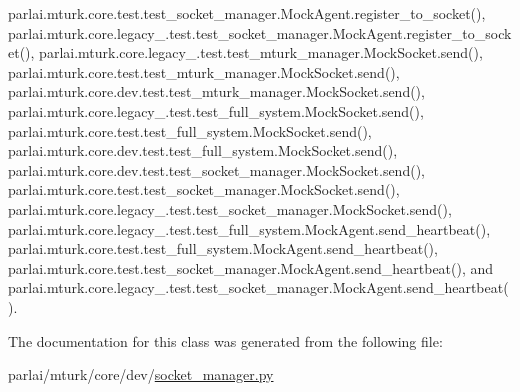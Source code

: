 parlai.\+mturk.\+core.\+test.\+test\+\_\+socket\+\_\+manager.\+Mock\+Agent.\+register\+\_\+to\+\_\+socket(), parlai.\+mturk.\+core.\+legacy\+\_.\+test.\+test\+\_\+socket\+\_\+manager.\+Mock\+Agent.\+register\+\_\+to\+\_\+socket(), parlai.\+mturk.\+core.\+legacy\+\_.\+test.\+test\+\_\+mturk\+\_\+manager.\+Mock\+Socket.\+send(), parlai.\+mturk.\+core.\+test.\+test\+\_\+mturk\+\_\+manager.\+Mock\+Socket.\+send(), parlai.\+mturk.\+core.\+dev.\+test.\+test\+\_\+mturk\+\_\+manager.\+Mock\+Socket.\+send(), parlai.\+mturk.\+core.\+legacy\+\_.\+test.\+test\+\_\+full\+\_\+system.\+Mock\+Socket.\+send(), parlai.\+mturk.\+core.\+test.\+test\+\_\+full\+\_\+system.\+Mock\+Socket.\+send(), parlai.\+mturk.\+core.\+dev.\+test.\+test\+\_\+full\+\_\+system.\+Mock\+Socket.\+send(), parlai.\+mturk.\+core.\+dev.\+test.\+test\+\_\+socket\+\_\+manager.\+Mock\+Socket.\+send(), parlai.\+mturk.\+core.\+test.\+test\+\_\+socket\+\_\+manager.\+Mock\+Socket.\+send(), parlai.\+mturk.\+core.\+legacy\+\_.\+test.\+test\+\_\+socket\+\_\+manager.\+Mock\+Socket.\+send(), parlai.\+mturk.\+core.\+legacy\+\_.\+test.\+test\+\_\+full\+\_\+system.\+Mock\+Agent.\+send\+\_\+heartbeat(), parlai.\+mturk.\+core.\+test.\+test\+\_\+full\+\_\+system.\+Mock\+Agent.\+send\+\_\+heartbeat(), parlai.\+mturk.\+core.\+test.\+test\+\_\+socket\+\_\+manager.\+Mock\+Agent.\+send\+\_\+heartbeat(), and parlai.\+mturk.\+core.\+legacy\+\_.\+test.\+test\+\_\+socket\+\_\+manager.\+Mock\+Agent.\+send\+\_\+heartbeat().



The documentation for this class was generated from the following file\+:\begin{DoxyCompactItemize}
\item 
parlai/mturk/core/dev/\hyperlink{dev_2socket__manager_8py}{socket\+\_\+manager.\+py}\end{DoxyCompactItemize}
